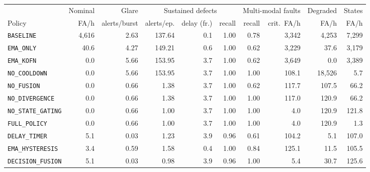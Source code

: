 \begin{tabular}{@{}lrrrrrrrrr@{}}
\toprule
 & Nominal & Glare & \multicolumn{3}{c}{Sustained defects} & \multicolumn{2}{c}{Multi-modal faults} & Degraded & States \\
\cmidrule(lr){4-6}\cmidrule(lr){7-8}
Policy & FA/h & alerts/burst & alerts/ep. & delay (fr.) & recall & recall & crit.\ FA/h & FA/h & FA/h \\
\midrule
\texttt{BASELINE} & 4{,}616 & 2.63 & 137.64 & 0.1 & 1.00 & 0.78 & 3{,}342 & 4{,}253 & 7{,}299 \\
\texttt{EMA\_ONLY} & 40.6 & 4.27 & 149.21 & 0.6 & 1.00 & 0.62 & 3{,}229 & 37.6 & 3{,}179 \\
\texttt{EMA\_KOFN} & 0.0 & 5.66 & 153.95 & 3.7 & 1.00 & 0.62 & 3{,}649 & 0.0 & 3{,}389 \\
\texttt{NO\_COOLDOWN} & 0.0 & 5.66 & 153.95 & 3.7 & 1.00 & 1.00 & 108.1 & 18{,}526 & 5.7 \\
\texttt{NO\_FUSION} & 0.0 & 0.66 & 1.38 & 3.7 & 1.00 & 0.62 & 117.7 & 107.5 & 66.2 \\
\texttt{NO\_DIVERGENCE} & 0.0 & 0.66 & 1.38 & 3.7 & 1.00 & 1.00 & 117.0 & 120.9 & 66.2 \\
\texttt{NO\_STATE\_GATING} & 0.0 & 0.66 & 1.00 & 3.7 & 1.00 & 1.00 & 4.0 & 120.9 & 121.8 \\
\texttt{FULL\_POLICY} & 0.0 & 0.66 & 1.00 & 3.7 & 1.00 & 1.00 & 4.0 & 120.9 & 1.3 \\
\midrule
\texttt{DELAY\_TIMER} & 5.1 & 0.03 & 1.23 & 3.9 & 0.96 & 0.61 & 104.2 & 5.1 & 107.0 \\
\texttt{EMA\_HYSTERESIS} & 3.4 & 0.59 & 1.58 & 0.4 & 1.00 & 0.84 & 125.1 & 11.5 & 105.5 \\
\texttt{DECISION\_FUSION} & 5.1 & 0.03 & 0.98 & 3.9 & 0.96 & 1.00 & 5.4 & 30.7 & 125.6 \\
\bottomrule
\end{tabular}
